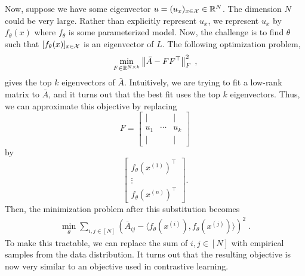 Now, suppose we have some eigenvector $u = (u_x)_{x \in \mathcal X} \in \mathbb R^N$. The dimension $N$ could be very large. Rather than explicitly represent $u_x$, we represent $u_x$ by $f_\theta(x)$ where $f_\theta$ is some parameterized model. Now, the challenge is to find $\theta$ such that $[f_\theta(x)]_{x \in \mathcal X}$ is an eigenvector of $L$. The following optimization problem,
\begin{align}
    \min_{F \in \mathbb R^{N \times k}} \left\|\bar{A} - F F^\top\right\|^2_F \;,
\end{align}
gives the top $k$ eigenvectors of $\bar{A}$. Intuitively, we are trying to fit a low-rank matrix to $\bar{A}$, and it turns out that the best fit uses the top $k$ eigenvectors. Thus, we can approximate this objective by replacing 
\begin{equation}
    F = \begin{bmatrix} \lvert &  & \lvert \\ u_1 & \cdots &  u_k \\ \lvert &  & \lvert \end{bmatrix}
\end{equation}
by
\begin{equation}
    \begin{bmatrix} f_\theta(x^{(1)})^\top \\ \vdots \\ f_\theta(x^{(n)})^\top \end{bmatrix}.
\end{equation} 
Then, the minimization problem after this substitution becomes
\begin{align}
    \min_\theta \sum_{i, j \in [N]} \left( \bar{A}_{ij} - \langle f_\theta(x^{(i)}), f_\theta(x^{(j)})\rangle \right)^2 \;.
\end{align}
To make this tractable, we can replace the sum of $i, j \in [N]$ with empirical samples from the data distribution. It turns out that the resulting objective is now very similar to an objective used in contrastive learning.